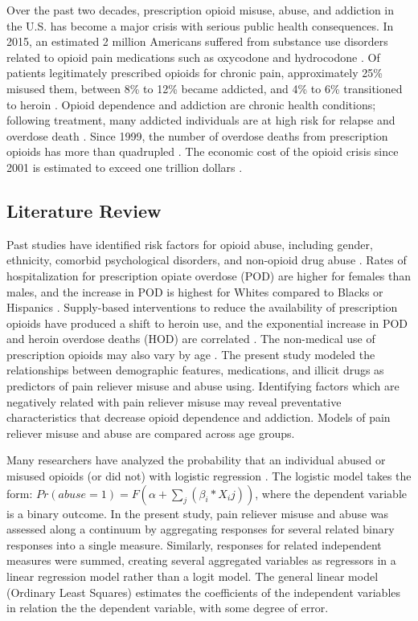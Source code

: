 \documentclass[sigconf]{acmart}
\begin{document}
Over the past two decades, prescription opioid misuse, abuse, and addiction 
in the U.S. has become a major crisis with serious public health consequences.
In 2015, an estimated 2 million Americans suffered from substance use disorders 
related to opioid pain medications such as oxycodone and hydrocodone 
\cite{nida18,cdc18}. Of patients legitimately prescribed opioids for chronic 
pain, approximately 25\% misused them, between 8\% to 12\% became addicted, and 
4\% to 6\% transitioned to heroin \cite{vowles15, carlson16}. Opioid dependence 
and addiction are chronic health conditions; following treatment, many addicted 
individuals are at high risk for relapse and overdose death \cite{shaham03}. 
Since 1999, the number of overdose deaths from prescription opioids has more 
than quadrupled \cite{cdc16}. The economic cost of the opioid crisis since 2001 
is estimated to exceed one trillion dollars \cite{altarum18}. 

\subsection{Literature Review}

Past studies have identified risk factors for opioid abuse, including gender, 
ethnicity, comorbid psychological disorders, and non-opioid drug abuse 
\cite{yokell13,rice12}. Rates of hospitalization for prescription opiate overdose 
(POD) are higher for females than males, and the increase in POD is highest for
Whites compared to Blacks or Hispanics \cite{unick13}. Supply-based interventions 
to reduce the availability of prescription opioids have produced a shift to 
heroin use, and the exponential increase in POD and heroin overdose deaths (HOD) 
are correlated \cite{jones15,reifler12}. The non-medical use of prescription 
opioids may also vary by age \cite{mccabe12}. The present study modeled the 
relationships between demographic features, medications, and illicit drugs as 
predictors of pain reliever misuse and abuse using. Identifying factors which 
are negatively related with pain reliever misuse may reveal preventative 
characteristics that decrease opioid dependence and addiction. Models of pain 
reliever misuse and abuse are compared across age groups. 


Many researchers have analyzed the probability that an individual abused 
or misused opioids (or did not) with logistic regression 
\cite{rice12, unick13, jones15, mccabe12}. The logistic model takes the form:
$ Pr(abuse=1) = F(\alpha+\sum_j(\beta_i*X_ij)) $, where the dependent variable
is a binary outcome. In the present study, pain reliever misuse and abuse was 
assessed along a continuum by aggregating responses for several related binary 
responses into a single measure. Similarly, responses for related independent 
measures were summed, creating several aggregated variables as regressors in a 
linear regression model rather than a logit model. The general linear model 
(Ordinary Least Squares) estimates the coefficients of the independent 
variables in relation the the dependent variable, with some degree of error. 
\end{document}

